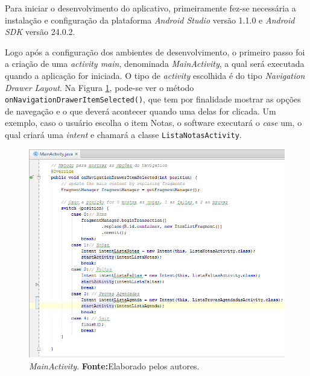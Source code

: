 
\par Para iniciar o desenvolvimento do aplicativo, primeiramente fez-se
necessária a instalação e configuração da plataforma \textit{Android Studio}
versão 1.1.0 e \textit{Android SDK} versão 24.0.2.

	\par Logo após a configuração dos ambientes de desenvolvimento, o primeiro
passo foi a criação de uma \textit{activity main}, denominada
\textit{MainActivity}, a qual será executada quando a aplicação for iniciada. O
tipo de \textit{activity} escolhida é do tipo \textit{Navigation Drawer
Layout}. Na Figura \ref{fig:qm4}, pode-se ver o método
\texttt{onNavigationDrawerItemSelected()}, que tem por finalidade mostrar as
opções de navegação e o que deverá acontecer quando uma delas for clicada. Um
exemplo, caso o usuário escolha o item Notas, o software executará o
\textit{case} um, o qual criará uma \textit{intent} e chamará a classe
\texttt{ListaNotasActivity}.
	
		\begin{figure}[h!]
			\centerline{\includegraphics[scale=0.4]{./imagens/2_q_metodologico/qm4.png}}
			\caption[\textit{MainActivity}]{\textit{MainActivity}.
			 \textbf{Fonte:}Elaborado pelos autores.}
			\label{fig:qm4}
		\end{figure}
		\pagebreak
		
